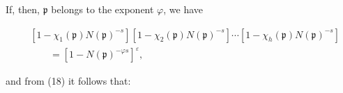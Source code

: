 If, then, $\mathfrak{p}$ belongs to the exponent $\varphi$, we have

\[
\begin{aligned}
&[1 - \chi_1(\mathfrak{p})N(\mathfrak{p})^{-s}][1 - \chi_2(\mathfrak{p})N(\mathfrak{p})^{-s}]\cdots[1 - \chi_h(\mathfrak{p})N(\mathfrak{p})^{-s}] \\
&\qquad = [1 - N(\mathfrak{p})^{-\varphi s}]^\varepsilon,
\end{aligned}
\]

and from (18) it follows that:

